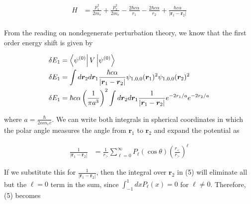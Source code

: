 \documentclass[]{article}
\begin{document}
\begin{enumerate}[1)]
\begin{equation}
\begin{split}
H & = \frac{p_1^2}{2m_e} + \frac{p_2^2}{2m_e} - \frac{2\hbar c\alpha}{r_1} - \frac{2\hbar c\alpha}{r_2}  +  \frac{\hbar c\alpha}{|\bm{r}_1 - \bm{r}_2|}\\
\end{split}
\end{equation}

From the reading on nondegenerate perturbation theory, we know that the first order energy shift is given by

\begin{equation}
\begin{split}
\delta E_1 & =  \bra{\psi^{(0)}} V \ket{\psi^{(0)}} \\
\delta E_1 & =  \int d\bm{r}_2 d\bm{r}_1   \frac{\hbar c\alpha}{|\bm{r}_1 - \bm{r}_2|}\psi_{1,0,0}(\bm{r}_1)^2\psi_{1,0,0}(\bm{r}_2)^2 \\
\delta E_1 & =  \hbar c\alpha\left( \frac{1}{\pi a^3}  \right)^2  \int d\bm{r}_2 d\bm{r}_1   \frac{1}{|\bm{r}_1 - \bm{r}_2|} e^{-2 r_1/ a}  e^{-2 r_2/ a}\\
\end{split}
\end{equation}

where $a = \frac{\hbar}{2\alpha m_e c}$. We can write both integrals in spherical coordinates in which the polar angle measures the angle from $\bm{r}_1$ to $\bm{r}_2$ and expand the potential as

\begin{equation}
\begin{split}
\frac{1}{|\bm{r}_1 - \bm{r}_2|} & = \frac{1}{r_>}\sum_{\ell=0}^{\infty} P_\ell(\cos\theta)\left(\frac{r_<}{r_>} \right)^\ell
\end{split}
\end{equation}

If we substitute this for $\frac{1}{|\bm{r}_1 - \bm{r}_2|}$, then the integral over $\bm{r}_2$ in (5) will eliminate all but the $\ell = 0$ term in the sum, since $\int_{-1}^{1}dx P_\ell(x) = 0$ for $\ell\ne 0$. Therefore, (5) becomes


\end{enumerate}
\end{document}
